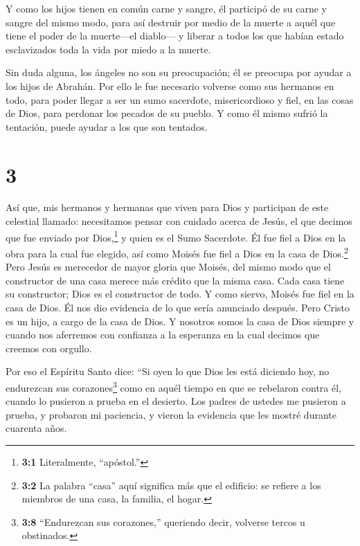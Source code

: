  Y como los hijos tienen en común carne y sangre, él
participó de su carne y sangre del mismo modo, para así destruir por
medio de la muerte a aquél que tiene el poder de la muerte---el
diablo---  y liberar a todos los que habían estado
esclavizados toda la vida por miedo a la muerte.

 Sin duda alguna, los ángeles no son su preocupación; él se
preocupa por ayudar a los hijos de Abrahán.  Por ello le
fue necesario volverse como sus hermanos en todo, para poder llegar a
ser un sumo sacerdote, misericordioso y fiel, en las cosas de Dios, para
perdonar los pecados de su pueblo.  Y como él mismo sufrió
la tentación, puede ayudar a los que son tentados.

\hypertarget{section-2}{%
\section{3}\label{section-2}}

 Así que, mis hermanos y hermanas que viven para Dios y
participan de este celestial llamado: necesitamos pensar con cuidado
acerca de Jesús, el que decimos que fue enviado por Dios,\footnote{\textbf{3:1}
  Literalmente, ``apóstol.''} y quien es el Sumo Sacerdote. 
Él fue fiel a Dios en la obra para la cual fue elegido, así como Moisés
fue fiel a Dios en la casa de Dios.\footnote{\textbf{3:2} La palabra
  ``casa'' aquí significa más que el edificio: se refiere a los miembros
  de una casa, la familia, el hogar.}  Pero Jesús es
merecedor de mayor gloria que Moisés, del mismo modo que el constructor
de una casa merece más crédito que la misma casa.  Cada casa
tiene su constructor; Dios es el constructor de todo.  Y
como siervo, Moisés fue fiel en la casa de Dios. Él nos dio evidencia de
lo que sería anunciado después.  Pero Cristo es un hijo, a
cargo de la casa de Dios. Y nosotros somos la casa de Dios siempre y
cuando nos aferremos con confianza a la esperanza en la cual decimos que
creemos con orgullo.

 Por eso el Espíritu Santo dice: ``Si oyen lo que Dios les
está diciendo hoy,  no endurezcan sus corazones\footnote{\textbf{3:8}
  ``Endurezcan sus corazones,'' queriendo decir, volverse tercos u
  obstinados.} como en aquél tiempo en que se rebelaron contra él,
cuando lo pusieron a prueba en el desierto.  Los padres de
ustedes me pusieron a prueba, y probaron mi paciencia, y vieron la
evidencia que les mostré durante cuarenta años.

